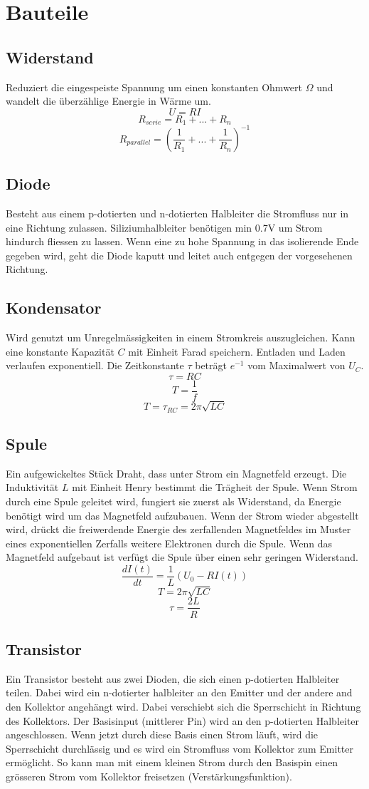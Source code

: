 \section*{Bauteile}
\subsection*{Widerstand}
Reduziert die eingespeiste Spannung um einen konstanten Ohmwert \(\Omega\) und wandelt die überzählige Energie in Wärme um.
\[U=RI\]
\[R_{serie} = R_1 + ... + R_n\]
\[R_{parallel} = \left(\frac{1}{R_1} + ... + \frac{1}{R_n}\right)^{-1}\]
\subsection*{Diode}
Besteht aus einem p-dotierten und n-dotierten Halbleiter die Stromfluss nur in eine Richtung zulassen. Siliziumhalbleiter benötigen min 0.7V um Strom hindurch fliessen zu lassen. Wenn eine zu hohe Spannung in das isolierende Ende gegeben wird, geht die Diode kaputt und leitet auch entgegen der vorgesehenen Richtung.
\subsection*{Kondensator}
Wird genutzt um Unregelmässigkeiten in einem Stromkreis auszugleichen. Kann eine konstante Kapazität \(C\) mit Einheit Farad speichern. Entladen und Laden verlaufen exponentiell. Die Zeitkonstante \(\tau\) beträgt \(e^{-1}\) vom Maximalwert von \(U_C\). 
\[\tau=RC\]
\[T=\frac{1}{f}\]
\[T=\tau_{RC}=2\pi\sqrt{LC}\]
\subsection*{Spule}
Ein aufgewickeltes Stück Draht, dass unter Strom ein Magnetfeld erzeugt. Die Induktivität \(L\) mit Einheit Henry bestimmt die Trägheit der Spule. Wenn Strom durch eine Spule geleitet wird, fungiert sie zuerst als Widerstand, da Energie benötigt wird um das Magnetfeld aufzubauen. Wenn der Strom wieder abgestellt wird, drückt die freiwerdende Energie des zerfallenden Magnetfeldes im Muster eines exponentiellen Zerfalls weitere Elektronen durch die Spule. Wenn das Magnetfeld aufgebaut ist verfügt die Spule über einen sehr geringen Widerstand.
\[\frac{dI(t)}{dt}=\frac{1}{L}(U_0-RI(t))\]
\[T=2\pi\sqrt{LC}\]
\[\tau = \frac{2L}{R}\]
\subsection*{Transistor}
Ein Transistor besteht aus zwei Dioden, die sich einen p-dotierten Halbleiter teilen. Dabei wird ein n-dotierter halbleiter an den Emitter und der andere and den Kollektor angehängt wird. Dabei verschiebt sich die Sperrschicht in Richtung des Kollektors. Der Basisinput (mittlerer Pin) wird an den p-dotierten Halbleiter angeschlossen. Wenn jetzt durch diese Basis einen Strom läuft, wird die Sperrschicht durchlässig und es wird ein Stromfluss vom Kollektor zum Emitter ermöglicht. So kann man mit einem kleinen Strom durch den Basispin einen grösseren Strom vom Kollektor freisetzen (Verstärkungsfunktion).
